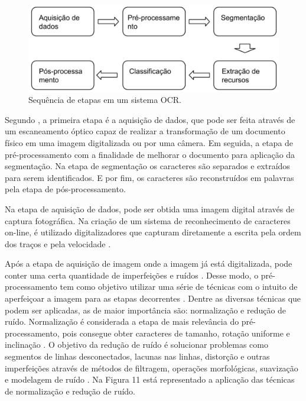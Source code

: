  \begin{figure}[h]
	\centering
	\includegraphics[width=1.0\textwidth]{Imagens/etapasocr} 
	\caption[Sequência de etapas em um sistema OCR.]{Sequência de etapas em um sistema OCR.}
	\label{fig:tux_laplace}
\end{figure}

Segundo , a primeira etapa é a aquisição de dados, que pode ser feita através de um escaneamento óptico capaz de realizar a transformação de um documento físico em uma imagem digitalizada ou por uma câmera. Em seguida, a etapa de pré-processamento com a finalidade de melhorar o documento para aplicação da segmentação. Na etapa de segmentação os caracteres são separados e extraídos para serem identificados. E por fim, os caracteres são reconstruídos em palavras pela etapa de pós-processamento.

Na etapa de aquisição de dados, pode ser obtida uma imagem digital através de captura fotográfica. Na criação de um sistema de reconhecimento de caracteres on-line, é utilizado digitalizadores que capturam diretamente a escrita pela ordem dos traços e pela velocidade \cite{Goswami2013}.

Após a etapa de aquisição de imagem onde a imagem já está digitalizada, pode conter uma certa quantidade de imperfeições e ruídos \cite{Eikvil1993}. Desse modo, o pré-processamento tem como objetivo utilizar uma série de técnicas com o intuito de aperfeiçoar a imagem para as etapas decorrentes \cite{Goswami2013}. Dentre as diversas técnicas que podem ser aplicadas, as de maior importância são: normalização e redução de ruído. Normalização é considerada a etapa de mais relevância do pré-processamento, pois consegue obter caracteres de tamanho, rotação uniforme e inclinação \cite{Eikvil1993}. O objetivo da redução de ruído é solucionar problemas como segmentos de linhas desconectados, lacunas nas linhas, distorção e outras imperfeições através de métodos de filtragem, operações morfológicas, suavização e modelagem de ruído \cite{Goswami2013}. 
Na Figura 11 está representado a aplicação das técnicas de normalização e redução de ruído.

